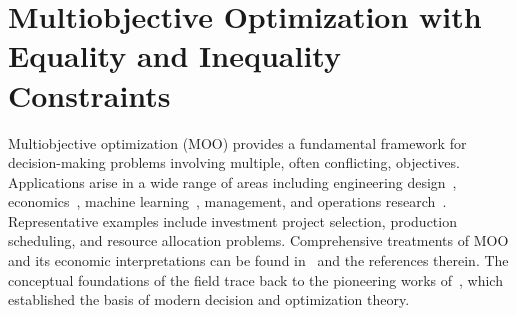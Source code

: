 \documentclass[11pt,pdflatex,sn-mathphys-ay]{sn-jnl}%
\theoremstyle{definition}
\theoremstyle{thmstyleone}%
\theoremstyle{thmstyletwo}%
\theoremstyle{thmstylethree}%
\begin{document}
	\section{Multiobjective Optimization with Equality and Inequality Constraints}
	\label{sec:moo_formulation}
	Multiobjective optimization (MOO) provides a fundamental framework for decision-making problems involving multiple, often conflicting, objectives. Applications arise in a wide range of areas including engineering design~\cite{rao2009engineering}, economics~\cite{miettinen1999nonlinear}, machine learning~\cite{emmerich2018tutorial}, management, and operations research~\cite{cohon2013multiobjective}. Representative examples include investment project selection, production scheduling, and resource allocation problems. Comprehensive treatments of MOO and its economic interpretations can be found in~\cite{Charne1961,Fandel1980} and the references therein. The conceptual foundations of the field trace back to the pioneering works of~\cite{pareto1964cours,neumann1944,koopmans1951}, which established the basis of modern decision and optimization theory.
	
\end{document}
